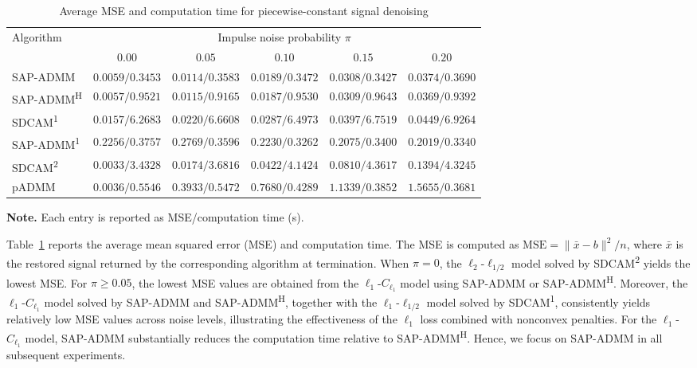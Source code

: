 \begin{table}[htbp]
\centering
\footnotesize
\caption{Average MSE and computation time for piecewise-constant signal denoising}
\label{tab:mse_time_comparison}
\renewcommand{\arraystretch}{1.10}
\setlength{\tabcolsep}{3.5pt}
\begin{tabular}{@{}lccccc@{}}
\toprule
\multirow{2}{*}{Algorithm}
& \multicolumn{5}{c}{Impulse noise probability \(\pi\)} \\
\cmidrule(lr){2-6}
& \(0.00\) & \(0.05\) & \(0.10\) & \(0.15\) & \(0.20\) \\
\midrule
SAP-ADMM
& \(0.0059/\mathbf{0.3453}\)
& \(\mathbf{0.0114}/\mathbf{0.3583}\)
& \(0.0189/0.3472\)
& \(\mathbf{0.0308}/0.3427\)
& \(0.0374/0.3690\) \\
SAP-ADMM\textsuperscript{H}
& \(0.0057/0.9521\)
& \(0.0115/0.9165\)
& \(\mathbf{0.0187}/0.9530\)
& \(0.0309/0.9643\)
& \(\mathbf{0.0369}/0.9392\) \\
SDCAM\textsuperscript{1}
& \(0.0157/6.2683\)
& \(0.0220/6.6608\)
& \(0.0287/6.4973\)
& \(0.0397/6.7519\)
& \(0.0449/6.9264\) \\
SAP-ADMM\textsuperscript{1}
& \(0.2256/0.3757\)
& \(0.2769/0.3596\)
& \(0.2230/\mathbf{0.3262}\)
& \(0.2075/\mathbf{0.3400}\)
& \(0.2019/\mathbf{0.3340}\) \\
SDCAM\textsuperscript{2}
& \(\mathbf{0.0033}/3.4328\)
& \(0.0174/3.6816\)
& \(0.0422/4.1424\)
& \(0.0810/4.3617\)
& \(0.1394/4.3245\) \\
pADMM
& \(0.0036/0.5546\)
& \(0.3933/0.5472\)
& \(0.7680/0.4289\)
& \(1.1339/0.3852\)
& \(1.5655/0.3681\) \\
\bottomrule
\end{tabular}

\vspace{2pt}
\begin{minipage}{0.96\linewidth}
\footnotesize
\textbf{Note.}
Each entry is reported as MSE/computation time (s).
\end{minipage}
\end{table}

Table~\ref{tab:mse_time_comparison} reports the average mean
squared error (MSE) and computation time.
The MSE is computed as \(\mathrm{MSE}=\|\bar x-b\|^2/n\),
where \(\bar x\) is the restored signal returned by the
corresponding algorithm at termination.
When \(\pi=0\), the \(\ell_2\)-\(\ell_{1/2}\) model
solved by SDCAM\textsuperscript{2} yields the lowest MSE.
For \(\pi\geq0.05\), the lowest MSE values are
obtained from the \(\ell_1\)-\(C_{\ell_1}\) model using
SAP-ADMM or SAP-ADMM\textsuperscript{H}.
Moreover, the \(\ell_1\)-\(C_{\ell_1}\) model solved by
SAP-ADMM and SAP-ADMM\textsuperscript{H}, together with the
\(\ell_1\)-\(\ell_{1/2}\) model solved by
SDCAM\textsuperscript{1}, consistently yields relatively low
MSE values across noise levels, illustrating the effectiveness
of the \(\ell_1\) loss combined with nonconvex penalties.
For the \(\ell_1\)-\(C_{\ell_1}\) model, SAP-ADMM substantially
reduces the computation time relative to SAP-ADMM\textsuperscript{H}.
Hence, we focus on SAP-ADMM
in all subsequent experiments.

